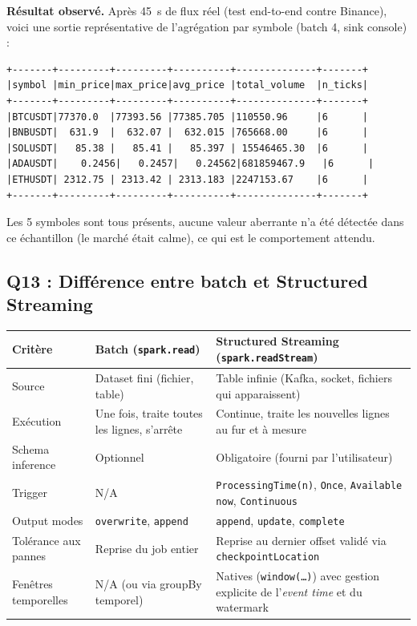 \documentclass{RapportINPTCLOUD}
\begin{document}
\textbf{R\'{e}sultat observ\'{e}.} Apr\`{e}s 45~s de flux r\'{e}el (test end-to-end contre Binance), voici une sortie repr\'{e}sentative de l'agr\'{e}gation par symbole (batch 4, sink console) :

\begin{lstlisting}[style=code]
+-------+---------+---------+----------+--------------+-------+
|symbol |min_price|max_price|avg_price |total_volume  |n_ticks|
+-------+---------+---------+----------+--------------+-------+
|BTCUSDT|77370.0  |77393.56 |77385.705 |110550.96     |6      |
|BNBUSDT|  631.9  |  632.07 |  632.015 |765668.00     |6      |
|SOLUSDT|   85.38 |   85.41 |   85.397 | 15546465.30  |6      |
|ADAUSDT|    0.2456|   0.2457|   0.24562|681859467.9   |6      |
|ETHUSDT| 2312.75 | 2313.42 | 2313.183 |2247153.67    |6      |
+-------+---------+---------+----------+--------------+-------+
\end{lstlisting}

Les 5 symboles sont tous pr\'{e}sents, aucune valeur aberrante n'a \'{e}t\'{e} d\'{e}tect\'{e}e dans ce \'{e}chantillon (le march\'{e} \'{e}tait calme), ce qui est le comportement attendu.

\subsection{Q13 : Diff\'{e}rence entre batch et Structured Streaming}

\begin{center}
\begin{tabular}{|p{3.2cm}|p{5.3cm}|p{5.3cm}|}
\hline
\textbf{Crit\`{e}re} & \textbf{Batch (\texttt{spark.read})} & \textbf{Structured Streaming (\texttt{spark.readStream})} \\
\hline
Source & Dataset fini (fichier, table) & Table infinie (Kafka, socket, fichiers qui apparaissent) \\
\hline
Ex\'{e}cution & Une fois, traite toutes les lignes, s'arr\^{e}te & Continue, traite les nouvelles lignes au fur et \`{a} mesure \\
\hline
Schema inference & Optionnel & Obligatoire (fourni par l'utilisateur) \\
\hline
Trigger & N/A & \texttt{ProcessingTime(n)}, \texttt{Once}, \texttt{Available now}, \texttt{Continuous} \\
\hline
Output modes & \texttt{overwrite}, \texttt{append} & \texttt{append}, \texttt{update}, \texttt{complete} \\
\hline
Tol\'{e}rance aux pannes & Reprise du job entier & Reprise au dernier offset valid\'{e} via \texttt{checkpointLocation} \\
\hline
Fen\^{e}tres temporelles & N/A (ou via groupBy temporel) & Natives (\texttt{window(\dots)}) avec gestion explicite de l'\textit{event time} et du watermark \\
\hline
\end{tabular}
\end{center}
\end{document}
